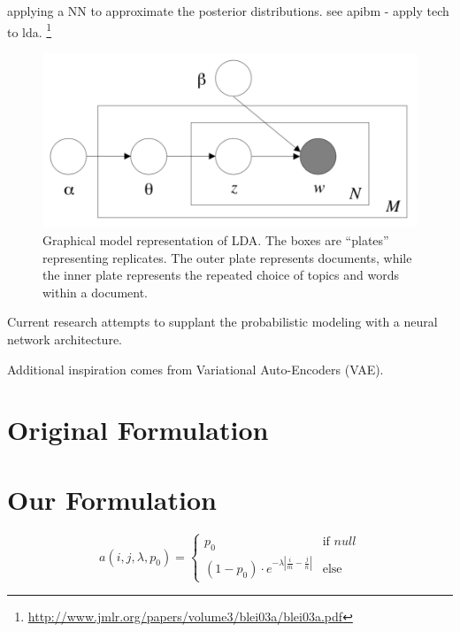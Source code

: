 \documentclass[twoside,twocolumn]{article}
\begin{document}
applying a NN to approximate the posterior distributions.
see apibm - apply tech to lda.
\footnote{\url{http://www.jmlr.org/papers/volume3/blei03a/blei03a.pdf}}

\begin{figure}
\centering
\includegraphics[scale=0.5]{LDADiagram}
\caption{Graphical model representation of LDA. The boxes are “plates” representing replicates. The outer plate represents documents, while the inner plate represents the repeated choice of topics and words within a document. }
\end{figure}

Current research attempts to supplant the probabilistic modeling with a neural network architecture. 

Additional inspiration comes from Variational Auto-Encoders (VAE).

\section{Original Formulation}

\section{Our Formulation}

\begin{equation}
a(i, j, \lambda, p_0) =
\begin{cases} 
      p_0 & \text{if } null \\
     (1-p_0) \cdot e^{-\lambda | \frac{i}{m} - \frac{j}{n}|} & \text{else}
   \end{cases}
\end{equation}
\end{document}
